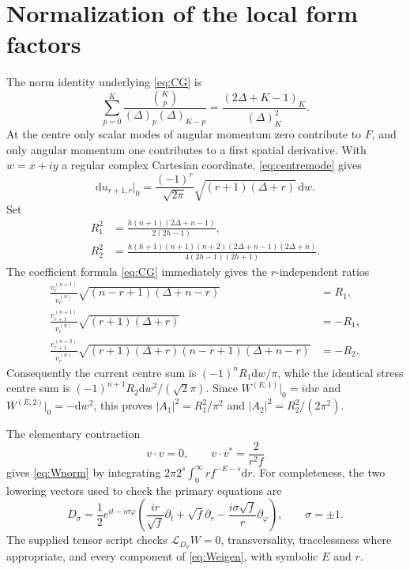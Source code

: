 \documentclass[11pt,a4paper]{article}
\numberwithin{equation}{section}
\theoremstyle{remark}\newtheorem{remark}[theorem]{Remark}
\newcommand{\dd}{\mathrm d}
\begin{document}
\section{Normalization of the local form factors}
\label{app:normalization}

The norm identity underlying \eqref{eq:CG} is
\begin{equation}
 \sum_{p=0}^K\frac{\binom Kp}{(\Delta)_p(\Delta)_{K-p}}
 =\frac{(2\Delta+K-1)_K}{(\Delta)_K^2}.
\end{equation}
At the centre only scalar modes of angular momentum zero contribute to $F$, and only angular momentum one contributes to a first spatial derivative. With $w=x+iy$ a regular complex Cartesian coordinate, \eqref{eq:centremode} gives
\begin{equation}
 \dd u_{r+1,r}\big|_0=\frac{(-1)^r}{\sqrt{2\pi}}
 \sqrt{(r+1)(\Delta+r)}\,\dd w.
\end{equation}
Set
\begin{align}
 R_1^2&=\frac{h(n+1)(2\Delta+n-1)}{2(2h-1)},\\
 R_2^2&=\frac{h(h+1)(n+1)(n+2)(2\Delta+n-1)(2\Delta+n)}{4(2h-1)(2h+1)}.
\end{align}
The coefficient formula \eqref{eq:CG} immediately gives the $r$-independent ratios
\begin{align}
 \frac{v_r^{(n+1)}}{v_r^{(n)}}
 \sqrt{(n-r+1)(\Delta+n-r)}&=R_1,\\
 \frac{v_{r+1}^{(n+1)}}{v_r^{(n)}}
 \sqrt{(r+1)(\Delta+r)}&=-R_1,\\
 \frac{v_{r+1}^{(n+2)}}{v_r^{(n)}}
 \sqrt{(r+1)(\Delta+r)(n-r+1)(\Delta+n-r)}&=-R_2.
\end{align}
Consequently the current centre sum is $(-1)^nR_1\dd w/\pi$, while the identical stress centre sum is
$(-1)^{n+1}R_2\dd w^2/(\sqrt2\pi)$.
Since $W^{(E,1)}|_0=i\dd w$ and
$W^{(E,2)}|_0=-\dd w^2$, this proves
$|A_1|^2=R_1^2/\pi^2$ and $|A_2|^2=R_2^2/(2\pi^2)$.

The elementary contraction
\begin{equation}
 v\cdot v=0,\qquad v\cdot v^*=\frac2{r^2f}
\end{equation}
gives \eqref{eq:Wnorm} by integrating
$2\pi 2^s\int_0^\infty r f^{-E-s}\dd r$.
For completeness, the two lowering vectors used to check the primary equations are
\begin{equation}
 D_\sigma=\frac12 e^{it-i\sigma\varphi}
 \left(\frac{ir}{\sqrt f}\partial_t+\sqrt f\partial_r
 -\frac{i\sigma\sqrt f}{r}\partial_\varphi\right),\qquad \sigma=\pm1.
\end{equation}
The supplied tensor script checks $\mathcal L_{D_\sigma}W=0$, transversality, tracelessness where appropriate, and every component of \eqref{eq:Weigen}, with symbolic $E$ and $r$.
\end{document}
